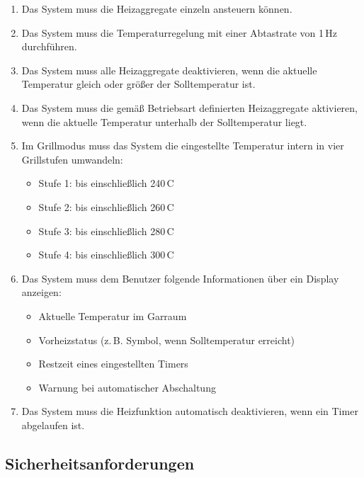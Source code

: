 \documentclass[a4paper,12pt]{article}
\begin{document}
\begin{enumerate}[label=\textbf{2.1.\arabic*}, itemsep=0pt, topsep=0pt, font=\bfseries]
\begin{itemize}
    \end{itemize}
    \item Das System muss die Heizaggregate einzeln ansteuern können.
    \item Das System muss die Temperaturregelung mit einer Abtastrate von 1\,Hz durchführen.
    \item Das System muss alle Heizaggregate deaktivieren, wenn die aktuelle Temperatur gleich oder größer der Solltemperatur ist.
    \item Das System muss die gemäß Betriebsart definierten Heizaggregate aktivieren, wenn die aktuelle Temperatur unterhalb der Solltemperatur liegt.
    \item Im Grillmodus muss das System die eingestellte Temperatur intern in vier Grillstufen umwandeln:
    \begin{itemize}
        \item Stufe 1: bis einschließlich 240\,\textdegree{}C
        \item Stufe 2: bis einschließlich 260\,\textdegree{}C
        \item Stufe 3: bis einschließlich 280\,\textdegree{}C
        \item Stufe 4: bis einschließlich 300\,\textdegree{}C
    \end{itemize}
    \item Das System muss dem Benutzer folgende Informationen über ein Display anzeigen:
    \begin{itemize}
        \item Aktuelle Temperatur im Garraum
        \item Vorheizstatus (z.\,B. Symbol, wenn Solltemperatur erreicht)
        \item Restzeit eines eingestellten Timers
        \item Warnung bei automatischer Abschaltung
    \end{itemize}
    \item Das System muss die Heizfunktion automatisch deaktivieren, wenn ein Timer abgelaufen ist.
\end{enumerate}

\subsection{Sicherheitsanforderungen}
\end{document}
